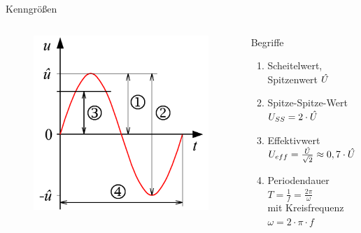 \begin{frame}{Kenngrößen}
  \begin{columns}[c]
    \begin{figure}
      \includegraphics[width=\textwidth,height=\textheight,keepaspectratio]{a11/Sinusspannung.pdf}
    \end{figure}
    \begin{block}{Begriffe}
      \begin{enumerate}
        \item Scheitelwert, Spitzenwert $\skew{4}\hat{U}$
        \item Spitze-Spitze-Wert $U_{SS} = 2 \cdot \skew{4}\hat{U}$
        \item Effektivwert $U_{eff} = \frac{\skew{4}\hat{U}}{\sqrt{2}} \approx 0,7 \cdot \skew{4}\hat{U}$
        \item Periodendauer $T = \frac{1}{f} = \frac{2\pi}{\omega}$\\
          mit Kreisfrequenz $\omega = 2\cdot\pi \cdot f$
      \end{enumerate}
    \end{block}
  \end{columns}
\end{frame}

